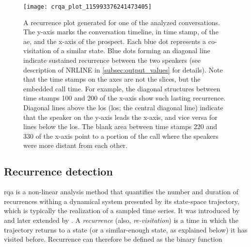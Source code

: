 \begin{figure}[H]
	\centering
	\texttt{[image: crqa\_plot\_115993376241473405]}
	\caption[\acs{crqa} analysis of pitch in a sales call]
		{A recurrence plot generated for one of the analyzed conversations.
		The y-axis marks the conversation timeline, in time stamp, of the \ac{ae}, and the x-axis of the prospect.
		Each blue dot represents a co-visitation of a similar state.
		Blue dots forming an diagonal line indicate sustained recurrence between the two speakers (see description of NRLINE in \cref{subsec:output_values} for details).
		Note that the time stamps on the axes are not the slices, but the embedded call time.
		For example, the diagonal structures between time stamps 100 and 200 of the x-axis show such lasting recurrence.
		Diagonal lines above the \acl{los} (\acs{los}; the central diagonal line) indicate that the speaker on the y-axis leads the x-axis, and vice versa for lines below the \ac{los}.
		The blank area between time stamps 220 and 330 of the x-axis point to a portion of the call where the speakers were more distant from each other.}
	\label{fig:crqa_plot}
\end{figure}

\subsection{Recurrence detection}
\label{subsec:recurrence_detection}

\Ac{rqa} is a non-linear analysis method that quantifies the number and duration of recurrences withing a dynamical system presented by its state-space trajectory, which is typically the realization of a sampled time series.
It was introduced by \citet{Zbilut1992embeddings} and later extended by \citet{Webber2005recurrence, Marwan2002cross}.
A \emph{recurrence} (also, \emph{re-visitation}) is a time in which the trajectory returns to a state (or a similar-enough state, as explained below) it has visited before.
Recurrence can therefore be defined as the binary function

